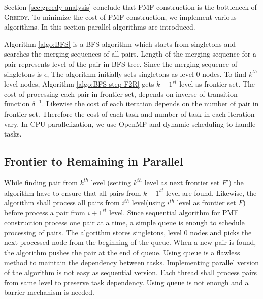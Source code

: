\documentclass[12pt]{article}
\newcommand{\comment}[2]{{\color{red}{\bf (#1: #2)}}}
\newcommand{\greedyAlgo}{\textsc{Greedy}}
\begin{document}
Section \ref{sec:greedy-analysis} conclude that PMF construction is the bottleneck of \greedyAlgo . To minimize the cost of PMF construction, we implement various algorithms. In this section parallel algorithms are introduced.

Algorithm \ref{algo:BFS} is a BFS algorithm which starts from singletons and searches the merging sequences of all pairs. Length of the merging sequence for a pair represents level of the pair in BFS tree. Since the merging sequence of singletons is $\epsilon$, The algorithm initially sets singletons as level 0 nodes. To find $k^{th}$ level nodes, Algorithm \ref{algo:BFS-step-F2R} gets $k-1^{st}$ level as frontier set. The cost of processing each pair in frontier set, depends on inverse of transition function $\delta^{-1}$. Likewise the cost of each iteration depends on the number of pair in frontier set. Therefore the cost of each task and number of task in each iteration vary. In CPU parallelization, we use OpenMP and dynamic scheduling to handle tasks. 

\comment{sertac}{BFS icin ornek figure cizilebilir}

\subsection{Frontier to Remaining in Parallel}
\label{sec:BFS-F2R-parallel}

While finding pair from $k^{th}$ level (setting $k^{th}$ level as next frontier set $F'$) the algorithm have to ensure that all pairs from $k-1^{st}$ level are found. Likewise, the algorithm shall process all pairs from $i^{th}$ level(using $i^{th}$ level as frontier set $F$) before process a pair from $i+1^{st}$ level. Since sequential algorithm for PMF construction process one pair at a time, a simple queue is enough to schedule processing of pairs. The algorithm stores singletons, level 0 nodes and picks the next processed node from the beginning of the queue. When a new pair is found, the algorithm pushes the pair at the end of queue. Using queue is a flawless method to maintain the dependency between tasks. Implementing parallel version of the algorithm is not easy as sequential version. Each thread shall process pairs from same level to preserve task dependency. Using queue is not enough and a barrier mechanism is needed.
\end{document}
